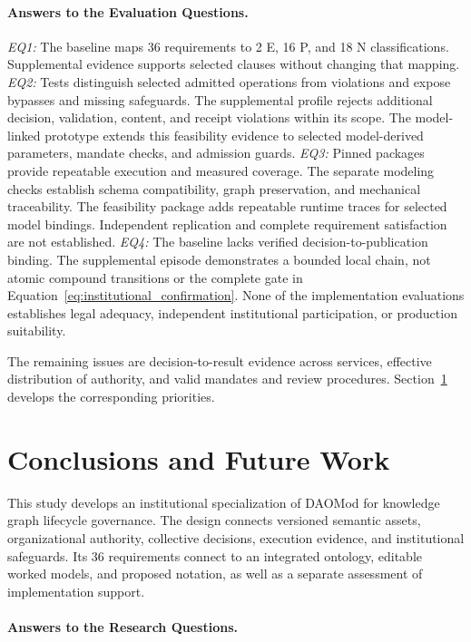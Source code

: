 \documentclass[journal]{IEEEtran}
\begin{document}
\paragraph{Answers to the Evaluation Questions.}
\emph{EQ1:} The baseline maps 36 requirements to 2 E, 16 P, and 18 N classifications. Supplemental evidence supports selected clauses without changing that mapping.
\emph{EQ2:} Tests distinguish selected admitted operations from violations and expose bypasses and missing safeguards. The supplemental profile rejects additional decision, validation, content, and receipt violations within its scope. The model-linked prototype extends this feasibility evidence to selected model-derived parameters, mandate checks, and admission guards.
\emph{EQ3:} Pinned packages provide repeatable execution and measured coverage. The separate modeling checks establish schema compatibility, graph preservation, and mechanical traceability. The feasibility package adds repeatable runtime traces for selected model bindings. Independent replication and complete requirement satisfaction are not established.
\emph{EQ4:} The baseline lacks verified decision-to-publication binding. The supplemental episode demonstrates a bounded local chain, not atomic compound transitions or the complete gate in Equation~\ref{eq:institutional_confirmation}. None of the implementation evaluations establishes legal adequacy, independent institutional participation, or production suitability.

The remaining issues are decision-to-result evidence across services, effective distribution of authority, and valid mandates and review procedures. Section~\ref{sec:conclusions} develops the corresponding priorities.

\section{Conclusions and Future Work}
\label{sec:conclusions}

This study develops an institutional specialization of DAOMod
for knowledge graph lifecycle governance. The design connects
versioned semantic assets, organizational authority, collective
decisions, execution evidence, and institutional safeguards.
Its 36 requirements connect to an integrated ontology,
editable worked models, and proposed notation, as well as a
separate assessment of implementation support.

\paragraph{Answers to the Research Questions.}
\end{document}
